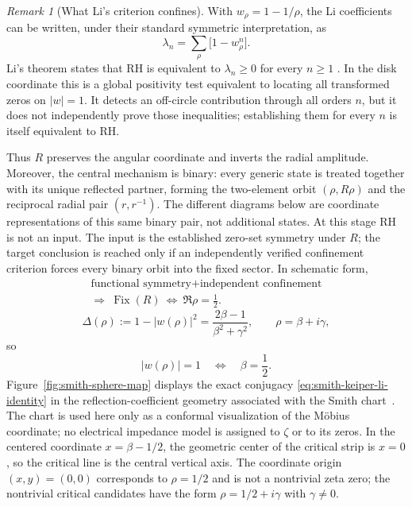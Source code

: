 \documentclass[11pt]{amsart}
\theoremstyle{definition}
\theoremstyle{remark}
\newtheorem{remark}[theorem]{Remark}
\begin{document}
\begin{remark}[What Li's criterion confines]\label{rem:li-confinement}
With $w_\rho=1-1/\rho$, the Li coefficients can be written, under their
standard symmetric interpretation, as
\[
 \lambda_n=\sum_\rho\bigl[1-w_\rho^n\bigr].
\]
Li's theorem states that RH is equivalent to $\lambda_n\ge0$ for every
$n\ge1$ \cite{Li1997,BombieriLagarias}.  In the disk coordinate this is a
global positivity test equivalent to locating all transformed zeros on
$|w|=1$.  It detects an off-circle contribution through all orders $n$, but
it does not independently prove those inequalities; establishing them for
every $n$ is itself equivalent to RH.
\end{remark}
Thus $R$ preserves the angular coordinate and inverts the radial amplitude.  Moreover,
the central mechanism is binary: every generic state is treated together with its unique
reflected partner, forming the two-element orbit $(\rho,R\rho)$ and the reciprocal radial pair
$(r,r^{-1})$.  The different diagrams below are coordinate representations of this same
binary pair, not additional states.
At this stage RH is not an input.  The input is the established zero-set symmetry under $R$;
the target conclusion is reached only if an independently verified confinement criterion
forces every binary orbit into the fixed sector.  In schematic form,
\begin{equation}\label{eq:noncircular-rule}
 \boxed{\begin{gathered}
 \text{functional symmetry}+\text{independent confinement}\\
 \Longrightarrow\ \operatorname{Fix}(R)
 \ \Longleftrightarrow\ \Re\rho=\frac12.
 \end{gathered}}
\end{equation}
\begin{equation}\label{eq:wdelta}
 \Delta(\rho):=1-|w(\rho)|^2
 =\frac{2\beta-1}{\beta^2+\gamma^2},
 \qquad \rho=\beta+i\gamma,
\end{equation}
so
\begin{equation}\label{eq:wcircle}
 |w(\rho)|=1\quad\Longleftrightarrow\quad\beta=\frac12.
\end{equation}
Figure~\ref{fig:smith-sphere-map} displays the exact conjugacy
\eqref{eq:smith-keiper-li-identity} in the reflection-coefficient geometry associated with
the Smith chart~\cite{Smith1939}.  The chart is used here only as a
conformal visualization of the M\"obius coordinate; no electrical impedance model is assigned
to $\zeta$ or to its zeros.
In the centered coordinate $x=\beta-1/2$, the geometric center of the critical strip is
$x=0$, so the critical line is the central vertical axis.  The coordinate origin
$(x,y)=(0,0)$ corresponds to $\rho=1/2$ and is not a nontrivial zeta zero; the nontrivial
critical candidates have the form $\rho=1/2+i\gamma$ with $\gamma\ne0$.
\end{document}
